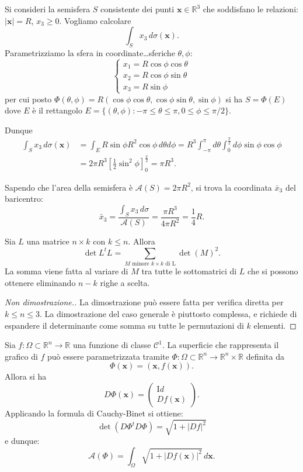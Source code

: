 \documentclass[italian,a4paper]{scrartcl}
\newcommand{\RR}{{\mathbb R}}
\renewcommand{\vec}{\mathbf}
\begin{document}
\begin{example}
Si consideri la semisfera $S$ consistente dei punti $\vec x\in
\RR^3$ che soddisfano le relazioni: $\lvert \vec x\rvert = R$, $x_3\ge 0$. Vogliamo
calcolare
\[
  \int_S x_3\, d\sigma(\vec x).
\]
Parametrizziamo la sfera in coordinate\dots sferiche $\theta, \phi$:
\[
\begin{cases}
  x_1 = R \cos \phi \cos \theta\\
  x_2 = R \cos \phi \sin \theta\\
  x_3 = R \sin \phi
\end{cases}
\]
per cui posto $\Phi(\theta,\phi) = R ( \cos\phi\cos \theta, \cos
\phi\sin \theta, \sin \phi)$ si ha $S=\Phi(E)$ dove $E$ è il
rettangolo $E=\{(\theta,\phi)\colon -\pi \le \theta \le \pi, 0 \le
\phi \le \pi/2\}$.

Dunque
\begin{align*}
  \int_S x_3\, d\sigma(\vec x) 
  &= \int_E R \sin \phi R^2 \cos \phi\, d\theta d\phi
  = R^3 \int_{-\pi}^\pi d \theta \int_0^{\frac \pi 2} d \phi \sin \phi
  \cos \phi
\\
  &= 2\pi R^3[\frac 1 2 \sin^2 \phi]_0^{\frac \pi 2}
  = \pi R^3.
\end{align*}

Sapendo che l'area della semisfera è $\mathcal A(S) = 2\pi R^2$, si
trova la coordinata $\bar x_3$ del baricentro:
\[
\bar x_3 = \frac{\int_S x_3\, d \sigma}{\mathcal A(S)} = \frac{\pi
  R^3}{4 \pi R^2} = \frac 1 4 R.
\]
\end{example}

\begin{theorem}
Sia $L$ una matrice $n \times k$ con $k\le n$. Allora
\[
  \det L^t L = \sum_{\text{$M$ minore $k\times k$ di L}} \det(M)^2.
\]
La somma viene fatta al variare di $M$ tra tutte le sottomatrici di
$L$ che si possono ottenere eliminando $n-k$ righe a scelta.
\end{theorem}
\begin{proof}[Non dimostrazione.]
La dimostrazione può essere fatta per verifica diretta per $k \le n
\le 3$. La dimostrazione del caso generale è piuttosto complessa, e
richiede di espandere il determinante come somma su tutte le
permutazioni di $k$ elementi.
\end{proof}

\begin{example}
Sia $f \colon \Omega\subset \RR^n \to \RR$ una funzione di classe
$\mathcal C^1$. La superficie che rappresenta il grafico di $f$ può
essere parametrizzata tramite $\Phi\colon \Omega\subset \RR^n \to
\RR^n\times \RR$ definita da
\[
  \Phi(\vec x) = (\vec x, f(\vec x)).
\]
Allora si ha
\[
  D\Phi(\vec x) = \begin{pmatrix}
  \mathrm Id\\
  Df(\vec x)
\end{pmatrix}.
\]
Applicando la formula di Cauchy-Binet
si ottiene:
\[
  \det(D\Phi^t D\Phi) = \sqrt{1+\lvert Df\rvert^2}
\]
e dunque:
\[
\mathcal A(\Phi) = \int_\Omega \sqrt{1+\lvert Df(\vec x)\rvert^2}\,
d \vec x.
\]
\end{example}
\end{document}
